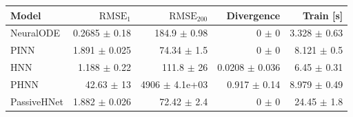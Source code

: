 \begin{tabular}{lrrrr}
\toprule
Model & $\mathrm{RMSE}_{1}$ & $\mathrm{RMSE}_{200}$ & Divergence & Train [s] \\ \midrule
NeuralODE & 0.2685 $\pm$ 0.18 & 184.9 $\pm$ 0.98 & 0 $\pm$ 0 & 3.328 $\pm$ 0.63 \\
PINN & 1.891 $\pm$ 0.025 & 74.34 $\pm$ 1.5 & 0 $\pm$ 0 & 8.121 $\pm$ 0.5 \\
HNN & 1.188 $\pm$ 0.22 & 111.8 $\pm$ 26 & 0.0208 $\pm$ 0.036 & 6.45 $\pm$ 0.31 \\
PHNN & 42.63 $\pm$ 13 & 4906 $\pm$ 4.1e+03 & 0.917 $\pm$ 0.14 & 8.979 $\pm$ 0.49 \\
PassiveHNet & 1.882 $\pm$ 0.026 & 72.42 $\pm$ 2.4 & 0 $\pm$ 0 & 24.45 $\pm$ 1.8 \\
\bottomrule
\end{tabular}